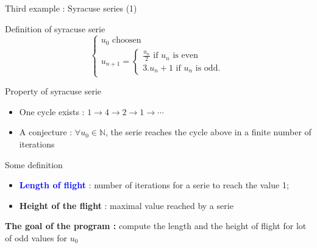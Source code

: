 \documentclass[compress,10pt,aspectratio=169]{beamer}
\begin{document}
\begin{frame}[fragile]{Third example : Syracuse series (1)}
\scriptsize 
\begin{block}{\small Definition of syracuse serie}
    \[
        \left\{
        \begin{array}{l}
            u_{0} \mbox{ choosen} \\
            u_{n+1} = \left\{
                \begin{array}{l}
                    \frac{u_{n}}{2} \mbox{ if } u_{n}\mbox{ is even}\\[1mm]
                    3.u_{n}+1 \mbox{ if } u_{n} \mbox{ is odd.}
                \end{array}
            \right.
        \end{array}
        \right.
    \]
\end{block}

\begin{exampleblock}{\small Property of syracuse serie}
    \begin{itemize}
        \item One cycle exists : $1 \rightarrow 4 \rightarrow 2 \rightarrow 1 \rightarrow \cdots$
        \item A conjecture : \alert{$\forall u_{0}\in \mathbb{N}$, 
              the serie reaches the cycle above in a finite number of iterations}
    \end{itemize}
\end{exampleblock}

\begin{alertblock}{\small Some definition}
    \begin{itemize}
        \item \textcolor{blue}{\bf Length of flight} : number of iterations for a serie to reach the value 1;
        \item \textcolor{NavyBlue}{\bf Height of the flight} : maximal value reached by a serie
    \end{itemize}
\end{alertblock}
\begin{center}{\bf The goal of the program : } compute the length and the height of flight for lot of 
    odd values for $u_{0}$
\end{center}
\end{frame}
\end{document}
